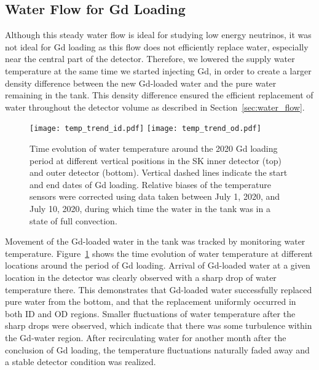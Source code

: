 \documentclass[preprint,12pt]{elsarticle}
\begin{document}
\subsection{Water Flow for Gd Loading}
\label{SS:B3}
Although this steady water flow is ideal for studying low energy neutrinos, it was not ideal for Gd loading as this flow does not efficiently replace water, especially near the central part of the detector.
Therefore, we lowered the supply water temperature at the same time we started injecting Gd, in order to create a larger density difference between the new Gd-loaded water and the pure water remaining in the tank. This density difference ensured the efficient replacement of water throughout the detector volume as described in Section~\ref{sec:water_flow}. 

\begin{figure}[hbt!]
\begin{center}
\texttt{[image: temp\_trend\_id.pdf]}
\texttt{[image: temp\_trend\_od.pdf]}
\caption{Time evolution of water temperature around the 2020 Gd loading period
at different vertical positions in the SK inner detector (top) and outer detector (bottom).
Vertical dashed lines indicate the start and end dates of Gd loading.
Relative biases of the temperature sensors were corrected using data taken between July 1, 2020, and July 10, 2020, during which time the water in the tank was in a state of full convection.
}
\label{fig:temp_profile_loading}
\end{center}
\end{figure}

Movement of the Gd-loaded water in the tank was tracked by monitoring water temperature. Figure~\ref{fig:temp_profile_loading} shows the time evolution of water temperature at different locations around the period of Gd loading. Arrival of Gd-loaded water at a given location in the detector was clearly observed with a sharp drop of water temperature there. This demonstrates that Gd-loaded water successfully replaced pure water from the bottom, and that the replacement uniformly occurred in both ID and OD regions.
Smaller fluctuations of water temperature after the sharp drops were observed, which indicate that there was some turbulence within the Gd-water region. After recirculating water for another month after the conclusion of Gd loading, the temperature fluctuations naturally faded away and a stable detector condition was realized.

\end{document}

